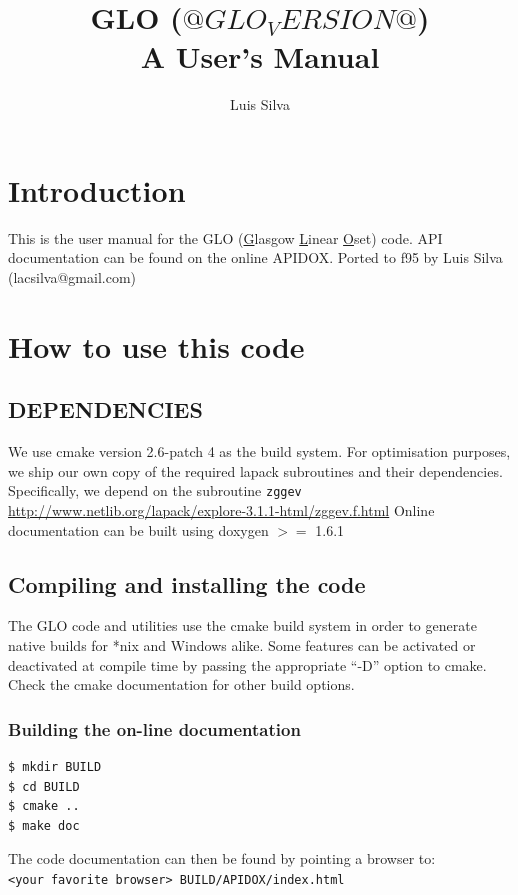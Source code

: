 \documentclass[a4paper,10pt]{book}
\title{GLO ($@GLO_VERSION@$) \\ A User's Manual}
\author{Luis Silva}
\begin{document}

\maketitle

\clearpage{}

\tableofcontents

\clearpage{}
\chapter*{Introduction}
This is the user manual for the GLO (\underline{G}lasgow \underline{L}inear \underline{O}set) code.
API documentation can be found on the online APIDOX.
Ported to f95 by Luis Silva (lacsilva@gmail.com)

\chapter{How to use this code}

\section{DEPENDENCIES}
We use cmake version 2.6-patch 4 as the build system.
For optimisation purposes, we ship our own copy of the required lapack
subroutines and their dependencies. Specifically, we depend on the subroutine
\verb|zggev| \url{http://www.netlib.org/lapack/explore-3.1.1-html/zggev.f.html}
Online documentation can be built using doxygen $>=$ 1.6.1

\section{Compiling and installing the code}
The GLO code and utilities use the cmake build system in order to generate
native builds for *nix and Windows alike. Some features can be activated or
deactivated at compile time by passing the appropriate ``-D'' option to cmake.
Check the cmake documentation \citep{CMakeDox} for other build options.

\subsection{Building the on-line documentation}
\begin{verbatim}
$ mkdir BUILD
$ cd BUILD
$ cmake ..
$ make doc
\end{verbatim}
The code documentation can then be found by pointing a browser
to:\\
\verb|<your favorite browser> BUILD/APIDOX/index.html|
\end{document}
